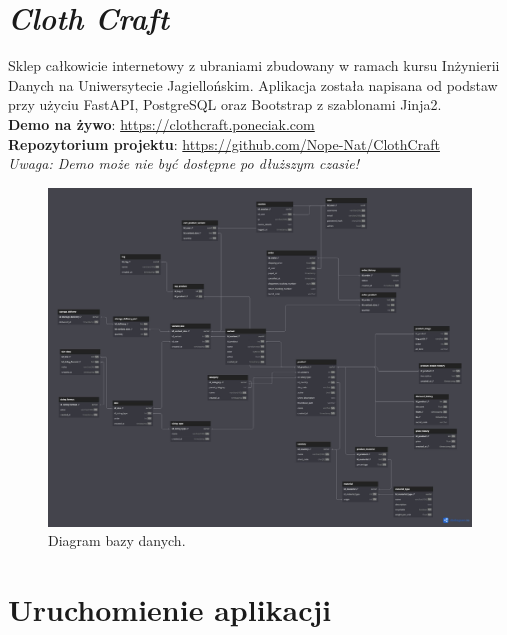 




\section*{\textit{Cloth Craft}}

Sklep całkowicie internetowy z ubraniami zbudowany w ramach kursu Inżynierii Danych na Uniwersytecie Jagiellońskim. Aplikacja została napisana od podstaw przy użyciu FastAPI, PostgreSQL oraz Bootstrap z szablonami Jinja2.\\
\textbf{Demo na żywo}: \url{https://clothcraft.poneciak.com}\\
\textbf{Repozytorium projektu}: \url{https://github.com/Nope-Nat/ClothCraft}\\
\textit{Uwaga: Demo może nie być dostępne po dłuższym czasie!}

\begin{figure}[h]
    \centering
    \includegraphics[width=1.0\textwidth]{diagram.jpeg}
    \caption{Diagram bazy danych.}
    \label{fig:database_diagram}
\end{figure}

\section*{Uruchomienie aplikacji}

